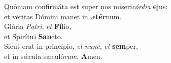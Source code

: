 \evenverse Quóniam confirmáta est super nos miseri\textit{cór}\textit{di}\textit{a} \textbf{e}jus:~\*\\
\evenverse et véritas Dómini manet in \textit{æ}\textbf{tér}num.\\
\oddverse Glória \textit{Pa}\textit{tri}, \textit{et} \textbf{Fí}lio,~\*\\
\oddverse et Spirítu\textit{i} \textbf{San}cto.\\
\evenverse Sicut erat in princípio, \textit{et} \textit{nunc}, \textit{et} \textbf{sem}per,~\*\\
\evenverse et in sǽcula sæculó\textit{rum}. \textbf{A}men.\\
